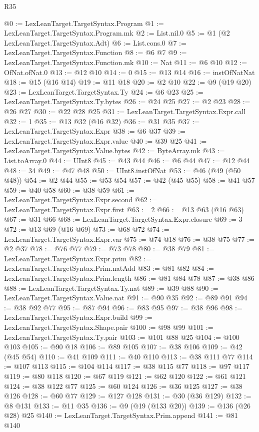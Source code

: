 \begin{lexlean}{R35}
\begin{coremodule}
@0 := LexLeanTarget.TargetSyntax.Program
@1 := LexLeanTarget.TargetSyntax.Program.mk
@2 := List.nil.{0}
@5 := @1 (@2 LexLeanTarget.TargetSyntax.Adt)
@6 := List.cons.{0}
@7 := LexLeanTarget.TargetSyntax.Function
@8 := @6 @7
@9 := LexLeanTarget.TargetSyntax.Function.mk
@10 := Nat
@11 := @6 @10
@12 := OfNat.ofNat.{0}
@13 := @12 @10
@14 := 0
@15 := @13 @14
@16 := instOfNatNat
@18 := @15 (@16 @14)
@19 := @11 @18
@20 := @2 @10
@22 := @9 (@19 @20)
@23 := LexLeanTarget.TargetSyntax.Ty
@24 := @6 @23
@25 := LexLeanTarget.TargetSyntax.Ty.bytes
@26 := @24 @25
@27 := @2 @23
@28 := @26 @27
@30 := @22 @28 @25
@31 := LexLeanTarget.TargetSyntax.Expr.call
@32 := 1
@35 := @13 @32 (@16 @32)
@36 := @31 @35
@37 := LexLeanTarget.TargetSyntax.Expr
@38 := @6 @37
@39 := LexLeanTarget.TargetSyntax.Expr.value
@40 := @39 @25
@41 := LexLeanTarget.TargetSyntax.Value.bytes
@42 := ByteArray.mk
@43 := List.toArray.{0}
@44 := UInt8
@45 := @43 @44
@46 := @6 @44
@47 := @12 @44
@48 := 34
@49 := @47 @48
@50 := UInt8.instOfNat
@53 := @46 (@49 (@50 @48))
@54 := @2 @44
@55 := @53 @54
@57 := @42 (@45 @55)
@58 := @41 @57
@59 := @40 @58
@60 := @38 @59
@61 := LexLeanTarget.TargetSyntax.Expr.second
@62 := LexLeanTarget.TargetSyntax.Expr.first
@63 := 2
@66 := @13 @63 (@16 @63)
@67 := @31 @66
@68 := LexLeanTarget.TargetSyntax.Expr.closure
@69 := 3
@72 := @13 @69 (@16 @69)
@73 := @68 @72
@74 := LexLeanTarget.TargetSyntax.Expr.var
@75 := @74 @18
@76 := @38 @75
@77 := @2 @37
@78 := @76 @77
@79 := @73 @78
@80 := @38 @79
@81 := LexLeanTarget.TargetSyntax.Expr.prim
@82 := LexLeanTarget.TargetSyntax.Prim.natAdd
@83 := @81 @82
@84 := LexLeanTarget.TargetSyntax.Prim.length
@86 := @81 @84 @78
@87 := @38 @86
@88 := LexLeanTarget.TargetSyntax.Ty.nat
@89 := @39 @88
@90 := LexLeanTarget.TargetSyntax.Value.nat
@91 := @90 @35
@92 := @89 @91
@94 := @38 @92 @77
@95 := @87 @94
@96 := @83 @95
@97 := @38 @96
@98 := LexLeanTarget.TargetSyntax.Expr.build
@99 := LexLeanTarget.TargetSyntax.Shape.pair
@100 := @98 @99
@101 := LexLeanTarget.TargetSyntax.Ty.pair
@103 := @101 @88 @25
@104 := @100 @103
@105 := @90 @18
@106 := @89 @105
@107 := @38 @106
@109 := @42 (@45 @54)
@110 := @41 @109
@111 := @40 @110
@113 := @38 @111 @77
@114 := @107 @113
@115 := @104 @114
@117 := @38 @115 @77
@118 := @97 @117
@119 := @80 @118
@120 := @67 @119
@121 := @62 @120
@122 := @61 @121
@124 := @38 @122 @77
@125 := @60 @124
@126 := @36 @125
@127 := @38 @126
@128 := @60 @77
@129 := @127 @128
@131 := @30 (@36 @129)
@132 := @8 @131
@133 := @11 @35
@136 := @9 (@19 (@133 @20))
@139 := @136 (@26 @28) @25
@140 := LexLeanTarget.TargetSyntax.Prim.append
@141 := @81 @140

\end{coremodule}
\end{lexlean}
